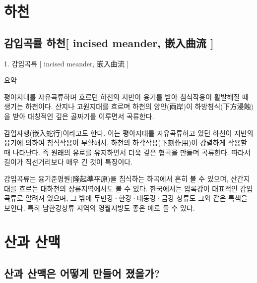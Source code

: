 \documentclass[12pt, a4paper, oneside]{book}
\begin{document}
	\newpage
	\chapter{하천}




	\newpage  \null
	\section{감입곡률 하천[ incised meander, 嵌入曲流 ] }



1. 		감입곡류 [ incised meander, 嵌入曲流 ] 


요약

평야지대를 자유곡류하며 흐르던 하천의 지반이 융기를 받아 침식작용이 활발해질 때 생기는 하천이다. 산지나 고원지대를 흐르며 하천의 양안(兩岸)이 하방침식(下方浸蝕)을 받아 대칭적인 깊은 골짜기를 이루면서 곡류한다.  






감입사행(嵌入蛇行)이라고도 한다. 이는 평야지대를 자유곡류하고 있던 하천이 지반의 융기에 의하여 침식작용이 부활해서, 하천의 하각작용(下刻作用)이 강렬하게 작용할 때 나타난다. 즉 원래의 유로를 유지하면서 더욱 깊은 협곡을 만들며 곡류한다. 따라서 길이가 직선거리보다 매우 긴 것이 특징이다. 

감입곡류는 융기준평원(隆起準平原)을 침식하는 하곡에서 흔히 볼 수 있으며, 산간지대를 흐르는 대하천의 상류지역에서도 볼 수 있다. 한국에서는 압록강이 대표적인 감입곡류로 알려져 있으며, 그 밖에 두만강·한강·대동강·금강 상류도 그와 같은 특색을 보인다. 특히 남한강상류 지역의 영월지방도 좋은 예로 들 수 있다. 




	\newpage
	\chapter{산과 산맥}



	\newpage  \null
	\section{산과 산맥은 어떻게 만들어 졌을가?}
\end{document}
